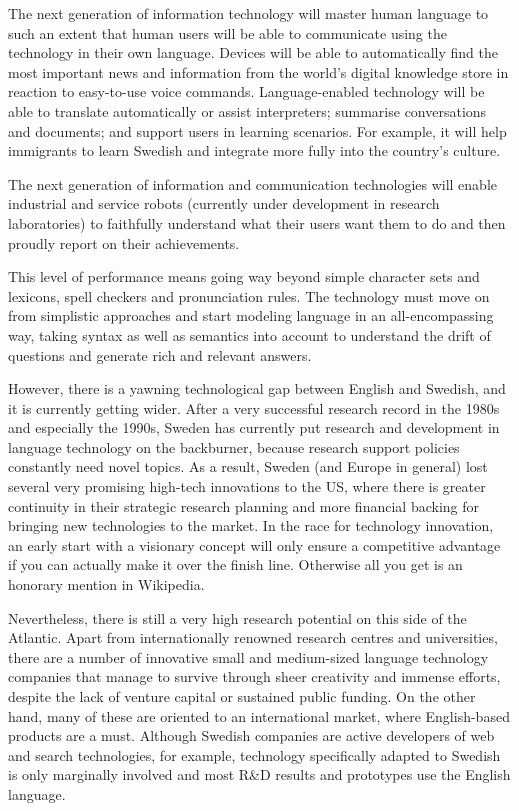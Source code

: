 \begin{multicols}{2}
The next generation of information technology will master \mbox{human}
language to such an extent that \mbox{human} users will be able to
communicate using the technology in their own language. Devices will
be able to automatically find the most important news and information
from the world’s digital knowledge store in reaction to easy-to-use
voice commands. Language-enabled technology will be able to translate
automatically or assist interpreters; summarise conversations and
documents; and support users in learning scenarios. For example, it
will help immigrants to learn Swedish and integrate more fully into
the country’s culture.

The next generation of information and communi\-cation technologies will
enable industrial and \mbox{service} robots (currently under development in
\mbox{research} laboratories) to faithfully understand what their users want
them to do and then proudly report on their achievements.

This level of performance means going way \mbox{beyond} simple character sets
and lexicons, spell checkers and pronunciation rules. The technology
must move on from simplistic approaches and start model\-ing language in
an all-encompassing way, taking \mbox{syntax} as well as semantics into
account to understand the drift of questions and generate rich and
rele\-vant \mbox{answers}.

However, there is a yawning technological gap \mbox{between} English and
Swedish, and it is currently getting wider. After a very successful
research record in the 1980s and especially the 1990s, Sweden has
currently put research and development in language technology on the
backburner, because \mbox{research} \mbox{support} policies constantly need novel
\mbox{topics}. As a result, Sweden (and Europe in general) lost \mbox{several} very
promising high-tech innovations to the US, where there is greater
continuity in their strategic research planning and more financial
backing for bringing new technologies to the market. In the race for
technology innovation, an early start with a vision\-ary concept will
only ensure a competitive advantage if you can actually make it over
the finish line. Otherwise all you get is an honorary mention in
Wikipedia.

 Nevertheless, there is still a very high research \mbox{potential} on this
 side of the Atlantic. Apart from internationally renowned research
 centres and universities, there are a number of innovative small and
 medium-sized language technology companies that manage to survive
 through sheer creativity and immense efforts, despite the lack of
 venture capital or sustained public funding. On the other hand, many
 of these are oriented to an international market, where English-based
 products are a must. Although Swedish companies are active developers
 of web and search technologies, for example, technology specifically
 adapted to Swedish is only marginally involved and most R\&D results
 and prototypes use the English language.


\end{multicols}

